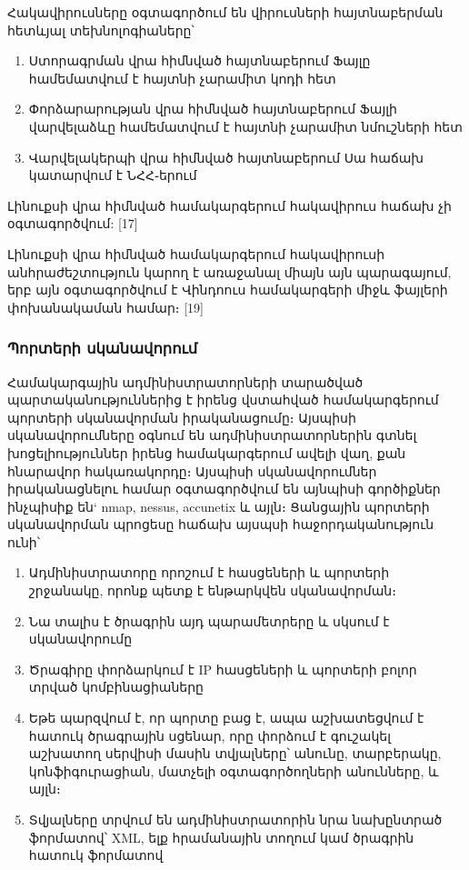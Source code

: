 \documentclass[11pt]{article}
\begin{document}
\begin{sloppypar}
Հակավիրուսները օգտագործում են վիրուսների հայտնաբերման հետևյալ տեխնոլոգիաները՝

\begin{enumerate}
\item Ստորագրման վրա հիմնված հայտնաբերում
    Ֆայլը համեմատվում է հայտնի չարամիտ կոդի հետ
\item Փորձարարության վրա հիմնված հայտնաբերում
    Ֆայլի վարվելաձևը համեմատվում է հայտնի չարամիտ
    նմուշների հետ
\item Վարվելակերպի վրա հիմնված հայտնաբերում
    Սա հաճախ կատարվում է ՆՀՀ֊երում
\end{enumerate}

Լինուքսի վրա հիմնված համակարգերում հակավիրուս հաճախ չի օգտագործվում: [17]

Լինուքսի վրա հիմնված համակարգերում հակավիրուսի անհրաժեշտություն կարող է
առաջանալ միայն այն պարագայում, երբ այն օգտագործվում է Վինդոուս համակարգերի
միջև ֆայլերի փոխանակաման համար։ [19]

\subsubsection{Պորտերի սկանավորում}

Համակարգային ադմինիստրատորների տարածված պարտականություններից է իրենց
վստահված համակարգերում պորտերի սկանավորման իրականացումը։
Այսպիսի սկանավորումները օգնում են ադմինիստրատորներին գտնել խոցելիություններ
իրենց համակարգերում ավելի վաղ, քան հնարավոր հակառակորդը։
Այսպիսի սկանավորումներ իրականացնելու համար օգտագործվում են այնպիսի
գործիքներ ինչպիսիք են` nmap, nessus, accunetix և այլն։
Ցանցային պորտերի սկանավորման պրոցեսը հաճախ այսպսի հաջորդականություն ունի՝

\begin{enumerate}
\item Ադմինիստրատորը որոշում է հասցեների և պորտերի շրջանակը, որոնք պետք է
    ենթարկվեն սկանավորման։
\item Նա տալիս է ծրագրին այդ պարամետրերը և սկսում է սկանավորումը
\item Ծրագիրը փորձարկում է IP հասցեների և պորտերի բոլոր տրված
    կոմբինացիաները
\item Եթե պարզվում է, որ պորտը բաց է, ապա աշխատեցվում է հատուկ ծրագրային
    սցենար, որը փորձում է գուշակել աշխատող սերվիսի մասին տվյալները՝
    անունը, տարբերակը, կոնֆիգուրացիան, մատչելի օգտագործողների անունները,
    և այլն։
\item Տվյալները տրվում են ադմինիստրատորին նրա նախընտրած ֆորմատով՝
    XML, ելք հրամանային տողում կամ ծրագրին հատուկ ֆորմատով
\end{enumerate}


\end{sloppypar}
\end{document}
